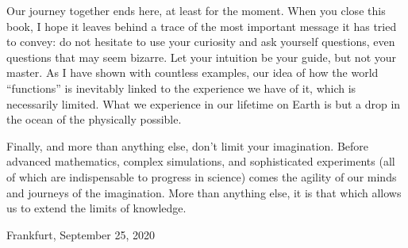 Our journey together ends here, at least for the moment. When you close this book, I
hope it leaves behind a trace of the most important message it has tried to convey: do
not hesitate to use your curiosity and ask yourself questions, even questions that may
seem bizarre. Let your intuition be your guide, but not your master. As I have shown
with countless examples, our idea of how the world ``functions'' is inevitably linked to
the experience we have of it, which is necessarily limited. What we experience in our
lifetime on Earth is but a drop in the ocean of the physically possible.

Finally, and more than anything else, don't limit your imagination. Before advanced
mathematics, complex simulations, and sophisticated experiments (all of which are
indispensable to progress in science) comes the agility of our minds and journeys of the
imagination. More than anything else, it is that which allows us to extend the limits of
knowledge.

Frankfurt, September 25, 2020
